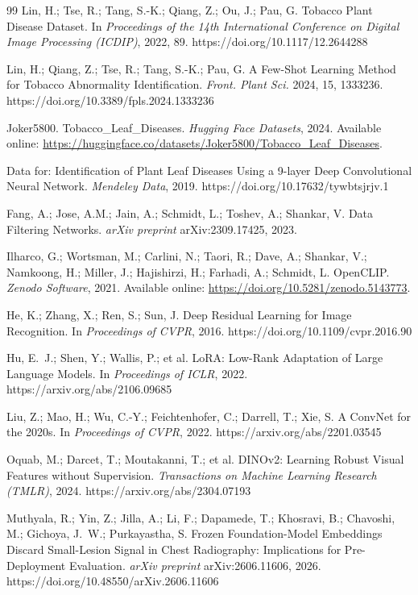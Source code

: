 \documentclass[10pt,a4paper]{article}
\begin{document}
\begin{thebibliography}{99}
Lin, H.; Tse, R.; Tang, S.-K.; Qiang, Z.; Ou, J.; Pau, G.
Tobacco Plant Disease Dataset.
In \emph{Proceedings of the 14th International Conference on Digital Image Processing (ICDIP)}, 2022, 89.
https://doi.org/10.1117/12.2644288

Lin, H.; Qiang, Z.; Tse, R.; Tang, S.-K.; Pau, G.
A Few-Shot Learning Method for Tobacco Abnormality Identification.
\emph{Front. Plant Sci.} 2024, 15, 1333236.
https://doi.org/10.3389/fpls.2024.1333236

Joker5800.
Tobacco\_Leaf\_Diseases.
\emph{Hugging Face Datasets}, 2024.
Available online: \url{https://huggingface.co/datasets/Joker5800/Tobacco_Leaf_Diseases}.

Data for: Identification of Plant Leaf Diseases Using a 9-layer Deep Convolutional Neural Network.
\emph{Mendeley Data}, 2019.
https://doi.org/10.17632/tywbtsjrjv.1

Fang, A.; Jose, A.M.; Jain, A.; Schmidt, L.; Toshev, A.; Shankar, V.
Data Filtering Networks.
\emph{arXiv preprint} arXiv:2309.17425, 2023.

Ilharco, G.; Wortsman, M.; Carlini, N.; Taori, R.; Dave, A.; Shankar, V.; Namkoong, H.; Miller, J.; Hajishirzi, H.; Farhadi, A.; Schmidt, L.
OpenCLIP.
\emph{Zenodo Software}, 2021.
Available online: \url{https://doi.org/10.5281/zenodo.5143773}.

He, K.; Zhang, X.; Ren, S.; Sun, J.
Deep Residual Learning for Image Recognition.
In \emph{Proceedings of CVPR}, 2016.
https://doi.org/10.1109/cvpr.2016.90

Hu, E.~J.; Shen, Y.; Wallis, P.; et al.
LoRA: Low-Rank Adaptation of Large Language Models.
In \emph{Proceedings of ICLR}, 2022.
https://arxiv.org/abs/2106.09685

Liu, Z.; Mao, H.; Wu, C.-Y.; Feichtenhofer, C.; Darrell, T.; Xie, S.
A ConvNet for the 2020s.
In \emph{Proceedings of CVPR}, 2022.
https://arxiv.org/abs/2201.03545

Oquab, M.; Darcet, T.; Moutakanni, T.; et al.
DINOv2: Learning Robust Visual Features without Supervision.
\emph{Transactions on Machine Learning Research (TMLR)}, 2024.
https://arxiv.org/abs/2304.07193

Muthyala, R.; Yin, Z.; Jilla, A.; Li, F.; Dapamede, T.; Khosravi, B.; Chavoshi, M.; Gichoya, J.~W.; Purkayastha, S.
Frozen Foundation-Model Embeddings Discard Small-Lesion Signal in Chest Radiography: Implications for Pre-Deployment Evaluation.
\emph{arXiv preprint} arXiv:2606.11606, 2026.
https://doi.org/10.48550/arXiv.2606.11606


\end{thebibliography}
\end{document}
